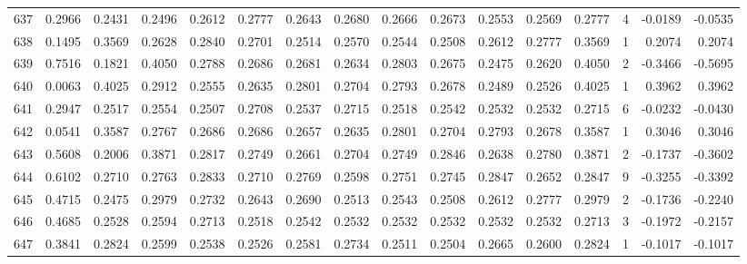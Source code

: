 \begin{tabular}{lrrrrrrrrrrrrrrr}
637 &      0.2966 &  0.2431 &  0.2496 &  0.2612 &  0.2777 &  0.2643 &  0.2680 &  0.2666 &  0.2673 &  0.2553 &   0.2569 &     0.2777 &      4 &                   -0.0189 &                    -0.0535 \\
638 &      0.1495 &  0.3569 &  0.2628 &  0.2840 &  0.2701 &  0.2514 &  0.2570 &  0.2544 &  0.2508 &  0.2612 &   0.2777 &     0.3569 &      1 &                    0.2074 &                     0.2074 \\
639 &      0.7516 &  0.1821 &  0.4050 &  0.2788 &  0.2686 &  0.2681 &  0.2634 &  0.2803 &  0.2675 &  0.2475 &   0.2620 &     0.4050 &      2 &                   -0.3466 &                    -0.5695 \\
640 &      0.0063 &  0.4025 &  0.2912 &  0.2555 &  0.2635 &  0.2801 &  0.2704 &  0.2793 &  0.2678 &  0.2489 &   0.2526 &     0.4025 &      1 &                    0.3962 &                     0.3962 \\
641 &      0.2947 &  0.2517 &  0.2554 &  0.2507 &  0.2708 &  0.2537 &  0.2715 &  0.2518 &  0.2542 &  0.2532 &   0.2532 &     0.2715 &      6 &                   -0.0232 &                    -0.0430 \\
642 &      0.0541 &  0.3587 &  0.2767 &  0.2686 &  0.2686 &  0.2657 &  0.2635 &  0.2801 &  0.2704 &  0.2793 &   0.2678 &     0.3587 &      1 &                    0.3046 &                     0.3046 \\
643 &      0.5608 &  0.2006 &  0.3871 &  0.2817 &  0.2749 &  0.2661 &  0.2704 &  0.2749 &  0.2846 &  0.2638 &   0.2780 &     0.3871 &      2 &                   -0.1737 &                    -0.3602 \\
644 &      0.6102 &  0.2710 &  0.2763 &  0.2833 &  0.2710 &  0.2769 &  0.2598 &  0.2751 &  0.2745 &  0.2847 &   0.2652 &     0.2847 &      9 &                   -0.3255 &                    -0.3392 \\
645 &      0.4715 &  0.2475 &  0.2979 &  0.2732 &  0.2643 &  0.2690 &  0.2513 &  0.2543 &  0.2508 &  0.2612 &   0.2777 &     0.2979 &      2 &                   -0.1736 &                    -0.2240 \\
646 &      0.4685 &  0.2528 &  0.2594 &  0.2713 &  0.2518 &  0.2542 &  0.2532 &  0.2532 &  0.2532 &  0.2532 &   0.2532 &     0.2713 &      3 &                   -0.1972 &                    -0.2157 \\
647 &      0.3841 &  0.2824 &  0.2599 &  0.2538 &  0.2526 &  0.2581 &  0.2734 &  0.2511 &  0.2504 &  0.2665 &   0.2600 &     0.2824 &      1 &                   -0.1017 &                    -0.1017 \\

\end{tabular}
